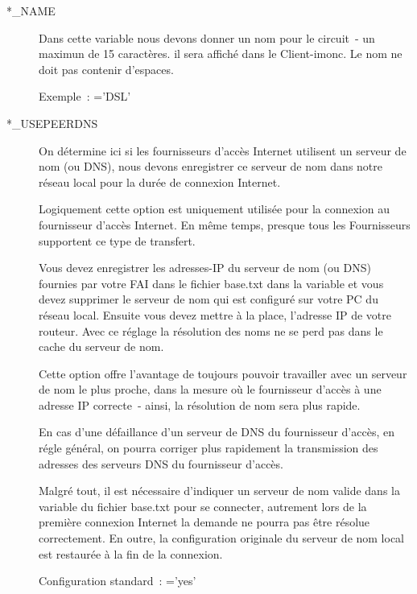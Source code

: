 \begin{description}
\item[*\_NAME]

Dans cette variable nous devons donner un nom pour le circuit~- un maximun
de 15 caractères. il sera affiché dans le Client-imonc. Le nom ne doit
pas contenir d'espaces.

Exemple~: ='DSL'

\item[*\_USEPEERDNS]

On détermine ici si les fournisseurs d'accès Internet utilisent un serveur
de nom (ou DNS), nous devons enregistrer ce serveur de nom dans notre réseau
local pour la durée de connexion Internet. 

Logiquement cette option est uniquement utilisée pour la connexion au
fournisseur d'accès Internet. En même temps, presque tous les Fournisseurs
supportent ce type de transfert.

Vous devez enregistrer les adresses-IP du serveur de nom (ou DNS) fournies par votre
FAI dans le fichier base.txt dans la variable  et vous
devez supprimer le serveur de nom qui est configuré sur votre PC du réseau
local. Ensuite vous devez mettre à la place, l'adresse IP de votre routeur. Avec
ce réglage la résolution des noms ne se perd pas dans le cache du serveur de nom.

Cette option offre l'avantage de toujours pouvoir travailler avec un serveur de
nom le plus proche, dans la mesure où le fournisseur d'accès à une adresse IP
correcte~- ainsi, la résolution de nom sera plus rapide.

En cas d'une défaillance d'un serveur de DNS du fournisseur d'accès, en régle
général, on pourra corriger plus rapidement la transmission des adresses des
serveurs DNS du fournisseur d'accès.

Malgré tout, il est nécessaire d'indiquer un serveur de nom valide dans la
variable  du fichier base.txt pour se connecter,
autrement lors de la première connexion Internet la demande ne pourra pas être
résolue correctement. En outre, la configuration originale du serveur de nom
local est restaurée à la fin de la connexion.

Configuration standard~: ='yes'


\end{description}
